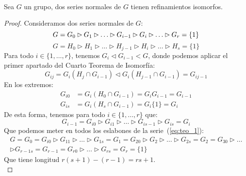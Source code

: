 \begin{teo}
    Sea $G$ un grupo, dos series normales de $G$ tienen refinamientos isomorfos.
    \begin{proof}
        Consideramos dos series normales de $G$:
        \begin{equation}\label{eq:teo_1}
            G = G_0 \rhd G_1 \rhd \ldots \rhd G_{i-1} \rhd G_i \rhd \ldots\rhd G_r = \{1\} \\
        \end{equation}
        \begin{equation}\label{eq:teo_2}
            G = H_0 \rhd H_1 \rhd \ldots \rhd H_{j-1} \rhd H_i \rhd \ldots \rhd H_s = \{1\}
        \end{equation}
        Para todo $i \in \{1,\ldots,r\}$, tenemos $G_i \lhd G_{i-1} < G$, donde podemos aplicar el primer apartado del Cuarto Teorema de Isomorfía:
        \begin{equation*}
            G_{ij} = G_i(H_j\cap G_{i-1}) \lhd G_i(H_{j-1}\cap G_{i-1}) = G_{ij-1}
        \end{equation*}
        En los extremos:
        \begin{align*}
            G_{i0} &= G_i(H_0\cap G_{i-1}) = G_iG_{i-1} = G_{i-1} \\
            G_{is} &= G_i(H_s\cap G_{i-1}) = G_i \{1\} = G_i
        \end{align*}
        De esta forma, tenemos para todo $i \in \{1,\ldots,r\}$ que:
        \begin{equation*}
            G_{i-1} = G_{i0} \rhd G_{i1} \rhd \ldots \rhd G_{is-1} \rhd G_{is} = G_i
        \end{equation*}
        Que podemos meter en todos los eslabones de la serie~(\ref{eq:teo_1}):
        \begin{multline*}
            G = G_0 = G_{i0} \rhd G_{11} \rhd \ldots \rhd G_{1s} = G_1 = G_{20} \rhd G_2 \rhd \ldots \rhd G_{2s} = G_2 = G_{30} \rhd \ldots  \\
            \rhd G_{r-1s} = G_{r-1} = G_{r0} \rhd \ldots \rhd G_{rs} = G_r =  \{1\}
        \end{multline*}
        Que tiene longitud $r(s+1)-(r-1) = rs + 1$.\\


\end{proof}
\end{teo}
